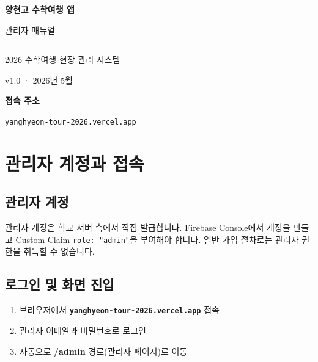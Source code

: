 \documentclass[a4paper,11pt]{article}
\begin{document}
\begin{titlepage}
  \centering
  \vspace*{3cm}
  {\Huge\bfseries\color{primary} 양현고 수학여행 앱}\par\vspace{0.5cm}
  {\LARGE 관리자 매뉴얼}\par\vspace{1cm}
  \textcolor{gray}{\rule{8cm}{0.5pt}}\par\vspace{1cm}
  {\large 2026 수학여행 현장 관리 시스템}\par\vspace{0.5cm}
  {\normalsize\color{gray} v1.0 · 2026년 5월}\par
  \vfill
  \begin{tcolorbox}[colback=lightblue, colframe=primary, arc=6pt,
    boxrule=1pt, width=10cm]
    \centering
    \textbf{접속 주소}\par\vspace{0.3em}
    {\large\color{primary}\texttt{yanghyeon-tour-2026.vercel.app}}
  \end{tcolorbox}
\end{titlepage}

\tableofcontents
\newpage

\section{관리자 계정과 접속}

\subsection{관리자 계정}

관리자 계정은 학교 서버 측에서 직접 발급합니다. Firebase Console에서 계정을 만들고
Custom Claim \texttt{role: "admin"}을 부여해야 합니다. 일반 가입 절차로는 관리자 권한을
취득할 수 없습니다.

\subsection{로그인 및 화면 진입}

\begin{enumerate}
  \item 브라우저에서 \textbf{\texttt{yanghyeon-tour-2026.vercel.app}} 접속
  \item 관리자 이메일과 비밀번호로 로그인
  \item 자동으로 \textbf{/admin} 경로(관리자 페이지)로 이동
\end{enumerate}
\end{document}
